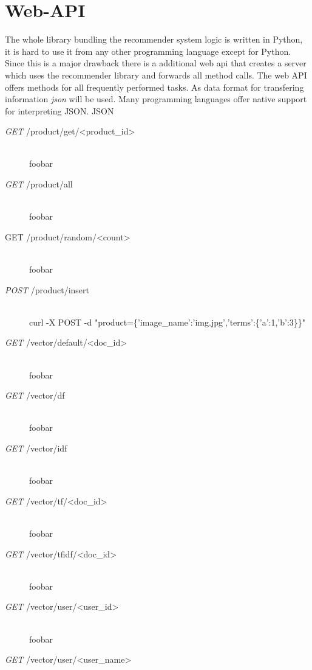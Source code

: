 

\section{Web-API}
\label{sec:web-api}
The whole library bundling the recommender system logic is written in Python, it is hard to use it from any other programming language except for Python.
Since this is a major drawback there is a additional \gls{web api} that creates a server which uses the recommender library and forwards all method calls.
The web API offers methods for all frequently performed tasks.
As data format for transfering information \textit{\gls{json}} will be used.
Many programming languages offer native support for interpreting JSON.
{\color{red}JSON}

\begin{description}
    \item[\textit{GET} /product/get/\textless product\_id\textgreater]\hfill\\
        foobar
    \item[\textit{GET} /product/all]\hfill\\
        foobar
    \item[GET /product/random/\textless count\textgreater]\hfill\\
        foobar
    \item[\textit{POST} /product/insert]\hfill\\
        curl -X POST -d "product=\{'image\_name':'img.jpg','terms':\{'a':1,'b':3\}\}"
    \item[\textit{GET} /vector/default/\textless doc\_id\textgreater]\hfill\\
        foobar
    \item[\textit{GET} /vector/df]\hfill\\
        foobar
    \item[\textit{GET} /vector/idf]\hfill\\
        foobar
    \item[\textit{GET} /vector/tf/\textless doc\_id\textgreater]\hfill\\
        foobar
    \item[\textit{GET} /vector/tfidf/\textless doc\_id\textgreater]\hfill\\
        foobar
    \item[\textit{GET} /vector/user/\textless user\_id\textgreater]\hfill\\
        foobar
    \item[\textit{GET} /vector/user/\textless user\_name\textgreater]\hfill\\

\end{description}
